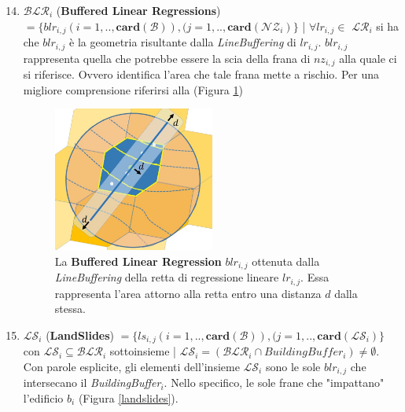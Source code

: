 \begin{enumerate}
	\setcounter{enumi}{13}
	\item \textbf{$ \mathcal{BLR}_i $} (\textbf{Buffered Linear Regressions}) $= \{blr_{i,j}(i=1,..,\mathbf{card}(\mathcal{B})),(j=1,..,\mathbf{card}(\mathcal{NZ}_i)\}$ | $\forall lr_{i,j} \in $ \textbf{$ \mathcal{LR}_i $} si ha che $blr_{i,j}$ è la geometria risultante dalla \textit{LineBuffering} di $lr_{i,j}$. $blr_{i,j}$ rappresenta quella che potrebbe essere la scia della frana di $nz_{i,j}$ alla quale ci si riferisce. Ovvero identifica l'area che tale frana mette a rischio. 
	Per una migliore comprensione riferirsi alla (Figura \ref{buffer_regression})
	
	\begin{figure}[h]
		\centering
		\includegraphics[width=0.5\textwidth]{images/buffer_rect}
		\caption{La \textbf{Buffered Linear Regression} $blr_{i,j}$ ottenuta dalla \textit{LineBuffering} della retta di regressione lineare $lr_{i,j}$. Essa rappresenta l'area attorno alla retta entro una distanza $d$ dalla stessa.}
		\label{buffer_regression}
	\end{figure}
	
	\item \textbf{$ \mathcal{LS}_i $} (\textbf{LandSlides}) $ = \{ls_{i,j}(i=1,..,\mathbf{card}(\mathcal{B})),(j=1,..,\mathbf{card}(\mathcal{LS}_i)\}$ con $\mathcal{LS}_i \subseteq \mathcal{BLR}_i$  sottoinsieme | $\mathcal{LS}_i = (\mathcal{BLR}_i  \cap BuildingBuffer_i)	\not= \emptyset $.
	Con parole esplicite, gli elementi dell'insieme $ \mathcal{LS}_i $ sono	le sole $blr_{i,j}$ che intersecano il \textit{BuildingBuffer$_i$}. Nello specifico, le sole frane che "impattano" l'edificio $b_i$ (Figura \ref{landslides}).
	

\end{enumerate}
